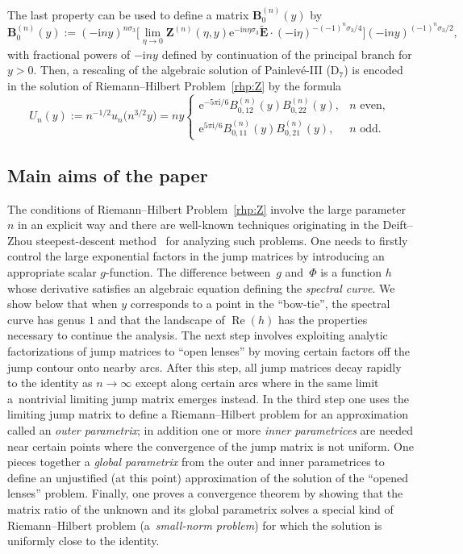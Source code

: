\documentclass[11pt]{article}
\numberwithin{equation}{section}
\numberwithin{equation}{section}
\begin{document}
The last property can be used to define a matrix $\mathbf{B}^{(n)}_0(y)$ by
\begin{equation}
\mathbf{B}^{(n)}_0(y):=(-\mathrm{i} ny)^{n\sigma_3}\Big[\lim_{\eta\to 0}\mathbf{Z}^{(n)}(\eta,y)\mathrm{e}^{-\mathrm{i} n\eta\sigma_3}\widetilde{\mathbf{E}}\cdot(-\mathrm{i}\eta)^{-(-1)^n\sigma_3/4}\Big](-\mathrm{i} n y)^{(-1)^n\sigma_3/2},
\label{eq:B0n}
\end{equation}
with fractional powers of $-\mathrm{i} n y$ defined by continuation of the principal branch for $y>0$.
Then, a rescaling of the algebraic solution of Painlev\'e-III (D$_7$) is encoded in the solution of Riemann--Hilbert Problem~\ref{rhp:Z} by the formula
\begin{equation}
U_n(y):=n^{-1/2}u_n\bigl(n^{3/2}y\bigr) =ny\begin{cases}\mathrm{e}^{-5\pi\mathrm{i}/6}B_{0,12}^{(n)}(y)B_{0,22}^{(n)}(y),& \text{$n$ even}, \\
\mathrm{e}^{5\pi\mathrm{i}/6}B_{0,11}^{(n)}(y)B_{0,21}^{(n)}(y),& \text{$n$ odd.}
\end{cases}
\label{eq:Uny}
\end{equation}

\subsection{Main aims of the paper}
The conditions of Riemann--Hilbert Problem~\ref{rhp:Z} involve the large parameter $n$ in an explicit way and there are well-known techniques originating in the Deift--Zhou steepest-descent method~\cite{DeiftZ93} for analyzing such problems. One needs to firstly control the large exponential factors in the jump matrices by introducing an appropriate scalar $g$-function. The difference between~$g$ and~$\Phi$ is a function $h$ whose derivative satisfies an algebraic equation defining the \emph{spectral curve}. We show below that when $y$ corresponds to a point in the ``bow-tie'', the spectral curve has genus $1$ and that the landscape of $\operatorname{Re}(h)$ has the properties necessary to continue the analysis. The next step involves exploiting analytic factorizations of jump matrices to ``open lenses'' by moving certain factors off the jump contour onto nearby arcs. After this step, all jump matrices decay rapidly to the identity as $n\to\infty$ except along certain arcs where in the same limit a~nontrivial limiting jump matrix emerges instead. In the third step one uses the limiting jump matrix to define a Riemann--Hilbert problem for an approximation called an \emph{outer parametrix}; in addition one or more \emph{inner parametrices} are needed near certain points where the convergence of the jump matrix is not uniform. One pieces together a \emph{global parametrix} from the outer and inner parametrices to define an unjustified (at this point) approximation of the solution of the ``opened lenses'' problem. Finally, one proves a convergence theorem by showing that the matrix ratio of the unknown and its global parametrix solves a special kind of Riemann--Hilbert problem (a~\emph{small-norm problem}) for which the solution is uniformly close to the identity.
\end{document}
